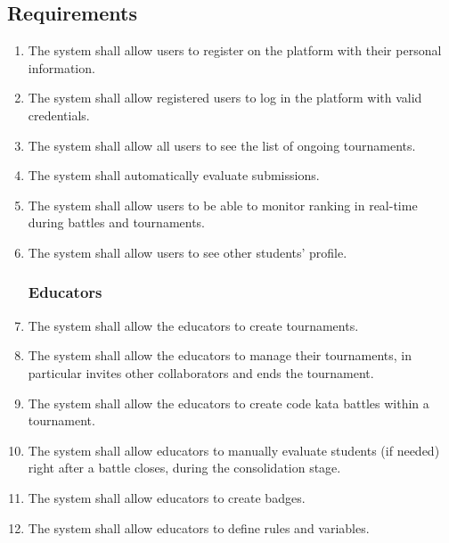     \subsection{Requirements}
        \begin{enumerate}[label=\textbf{R.\arabic*}]
            \subsubsection*{Users}
            \item {} {The system shall allow users to register on the platform with their personal information.}
            \item {} {The system shall allow registered users to log in the platform with valid credentials.}
            \item {} {The system shall allow all users to see the list of ongoing tournaments.}
            \item {} {The system shall automatically evaluate submissions.}
            \item {} {The system shall allow users to be able to monitor ranking in real-time during battles and tournaments.}
            \item {} {The system shall allow users to see other students' profile.}
            
            \subsubsection*{Educators}
            \item {} {The system shall allow the educators to create tournaments.}
            \item {} {The system shall allow the educators to manage their tournaments, in particular invites other collaborators and ends the tournament.}
            \item {} {The system shall allow the educators to create code kata battles within a tournament.}
             \item {} {The system shall allow educators to manually evaluate students (if needed) right after a battle closes, during the consolidation stage.}
            \item {} {The system shall allow educators to create badges.}
            \item {} {The system shall allow educators to define rules and variables.}


\end{enumerate}
